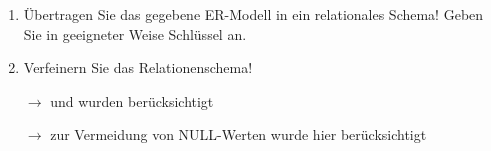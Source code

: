 \documentclass{lehramt-informatik-aufgabe}
\begin{document}
\begin{enumerate}


\item Übertragen Sie das gegebene ER-Modell in ein
relationales Schema! Geben Sie in geeigneter Weise Schlüssel an.

\begin{antwort}
\begin{liRmodell}
\end{liRmodell}
\end{antwort}


\item Verfeinern Sie das Relationenschema!

\begin{antwort}
\begin{liRmodell}
\end{liRmodell}

$\rightarrow$  und  wurden
berücksichtigt

\begin{liRmodell}
\end{liRmodell}

$\rightarrow$ zur Vermeidung von NULL-Werten wurde hier
 berücksichtigt

\begin{liRmodell}
\end{liRmodell}
\end{antwort}
\end{enumerate}
\end{document}
